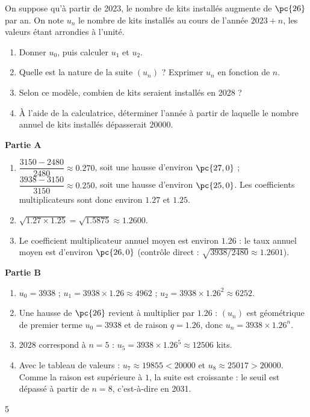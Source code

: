 {On suppose qu'à partir de 2023, le nombre de kits installés augmente de $\pc{26}$ par an. On note $u_n$ le nombre de kits installés au cours de l'année $2023+n$, les valeurs étant arrondies à l'unité.
\begin{enumerate}
\item Donner $u_0$, puis calculer $u_1$ et $u_2$.
\item Quelle est la nature de la suite $(u_n)$ ? Exprimer $u_n$ en fonction de $n$.
\item Selon ce modèle, combien de kits seraient installés en 2028 ?
\item À l'aide de la calculatrice, déterminer l'année à partir de laquelle le nombre annuel de kits installés dépasserait $\num{20000}$.
\end{enumerate}
}{%
\textbf{Partie A}
\begin{enumerate}
\item $\dfrac{\num{3150}-\num{2480}}{\num{2480}}\approx\num{0,270}$, soit une hausse d'environ $\pc{27,0}$ ; $\dfrac{\num{3938}-\num{3150}}{\num{3150}}\approx\num{0,250}$, soit une hausse d'environ $\pc{25,0}$. Les coefficients multiplicateurs sont donc environ $\num{1,27}$ et $\num{1,25}$.
\item $\sqrt{\num{1,27}\times\num{1,25}}=\sqrt{\num{1,5875}}\approx\num{1,2600}$.
\item Le coefficient multiplicateur annuel moyen est environ $\num{1,26}$ : le taux annuel moyen est d'environ $\pc{26,0}$ (contrôle direct : $\sqrt{\num{3938}/\num{2480}}\approx\num{1,2601}$).
\end{enumerate}
\textbf{Partie B}
\begin{enumerate}
\item $u_0=\num{3938}$ ; $u_1=\num{3938}\times\num{1,26}\approx\num{4962}$ ; $u_2=\num{3938}\times\num{1,26}^2\approx\num{6252}$.
\item Une hausse de $\pc{26}$ revient à multiplier par $\num{1,26}$ : $(u_n)$ est géométrique de premier terme $u_0=\num{3938}$ et de raison $q=\num{1,26}$, donc $u_n=\num{3938}\times\num{1,26}^n$.
\item 2028 correspond à $n=5$ : $u_5=\num{3938}\times\num{1,26}^5\approx\num{12506}$ kits.
\item Avec le tableau de valeurs : $u_7\approx\num{19855}<\num{20000}$ et $u_8\approx\num{25017}>\num{20000}$. Comme la raison est supérieure à $1$, la suite est croissante : le seuil est dépassé à partir de $n=8$, c'est-à-dire en 2031.
\end{enumerate}
}{5}

